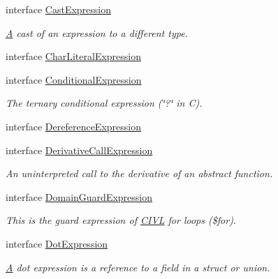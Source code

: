\begin{DoxyCompactItemize}
interface \hyperlink{interfaceedu_1_1udel_1_1cis_1_1vsl_1_1civl_1_1model_1_1IF_1_1expression_1_1CastExpression}{Cast\+Expression}
\begin{DoxyCompactList}\small\item\em \hyperlink{structA}{A} cast of an expression to a different type. \end{DoxyCompactList}\item 
interface \hyperlink{interfaceedu_1_1udel_1_1cis_1_1vsl_1_1civl_1_1model_1_1IF_1_1expression_1_1CharLiteralExpression}{Char\+Literal\+Expression}
\item 
interface \hyperlink{interfaceedu_1_1udel_1_1cis_1_1vsl_1_1civl_1_1model_1_1IF_1_1expression_1_1ConditionalExpression}{Conditional\+Expression}
\begin{DoxyCompactList}\small\item\em The ternary conditional expression (\char`\"{}?\char`\"{} in C). \end{DoxyCompactList}\item 
interface \hyperlink{interfaceedu_1_1udel_1_1cis_1_1vsl_1_1civl_1_1model_1_1IF_1_1expression_1_1DereferenceExpression}{Dereference\+Expression}
\item 
interface \hyperlink{interfaceedu_1_1udel_1_1cis_1_1vsl_1_1civl_1_1model_1_1IF_1_1expression_1_1DerivativeCallExpression}{Derivative\+Call\+Expression}
\begin{DoxyCompactList}\small\item\em An uninterpreted call to the derivative of an abstract function. \end{DoxyCompactList}\item 
interface \hyperlink{interfaceedu_1_1udel_1_1cis_1_1vsl_1_1civl_1_1model_1_1IF_1_1expression_1_1DomainGuardExpression}{Domain\+Guard\+Expression}
\begin{DoxyCompactList}\small\item\em This is the guard expression of \hyperlink{classedu_1_1udel_1_1cis_1_1vsl_1_1civl_1_1CIVL}{C\+I\+V\+L} for loops ({\ttfamily \$for}). \end{DoxyCompactList}\item 
interface \hyperlink{interfaceedu_1_1udel_1_1cis_1_1vsl_1_1civl_1_1model_1_1IF_1_1expression_1_1DotExpression}{Dot\+Expression}
\begin{DoxyCompactList}\small\item\em \hyperlink{structA}{A} dot expression is a reference to a field in a struct or union. \end{DoxyCompactList}\item 

\end{DoxyCompactItemize}
